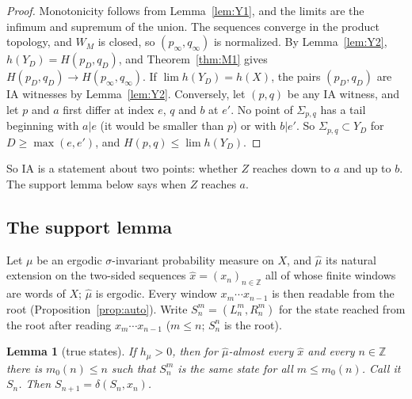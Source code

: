 \documentclass[11pt]{amsart}
\newtheorem{lemma}[theorem]{Lemma}
\theoremstyle{definition}
\theoremstyle{remark}
\newcommand{\Z}{\mathbb{Z}}
\begin{document}
\begin{proof}
Monotonicity follows from Lemma~\ref{lem:Y1}, and the limits are the infimum and supremum of the union. The sequences converge in the product topology, and $W_M$ is closed, so $(p_\infty,q_\infty)$ is normalized. By Lemma~\ref{lem:Y2}, $h(Y_D)=H(p_D,q_D)$, and Theorem~\ref{thm:M1} gives $H(p_D,q_D)\to H(p_\infty,q_\infty)$. If $\lim h(Y_D)=h(X)$, the pairs $(p_D,q_D)$ are IA witnesses by Lemma~\ref{lem:Y2}. Conversely, let $(p,q)$ be any IA witness, and let $p$ and $a$ first differ at index $e$, $q$ and $b$ at $e'$. No point of $\Sigma_{p,q}$ has a tail beginning with $a|e$ (it would be smaller than $p$) or with $b|e'$. So $\Sigma_{p,q}\subset Y_D$ for $D\ge\max(e,e')$, and $H(p,q)\le\lim h(Y_D)$.
\end{proof}

So IA is a statement about two points: whether $Z$ reaches down to $a$ and up to $b$. The support lemma below says when $Z$ reaches $a$.

\subsection{The support lemma}
Let $\mu$ be an ergodic $\sigma$-invariant probability measure on $X$, and $\hat\mu$ its natural extension on the two-sided sequences $\hat x=(x_n)_{n\in\Z}$ all of whose finite windows are words of $X$; $\hat\mu$ is ergodic. Every window $x_m\cdots x_{n-1}$ is then readable from the root (Proposition~\ref{prop:auto}). Write $S^m_n=(L^m_n,R^m_n)$ for the state reached from the root after reading $x_m\cdots x_{n-1}$ ($m\le n$; $S^n_n$ is the root).

\begin{lemma}[true states]\label{lem:S1}
If $h_\mu>0$, then for $\hat\mu$-almost every $\hat x$ and every $n\in\Z$ there is $m_0(n)\le n$ such that $S^m_n$ is the same state for all $m\le m_0(n)$. Call it $S_n$. Then $S_{n+1}=\delta(S_n,x_n)$.
\end{lemma}
\end{document}
